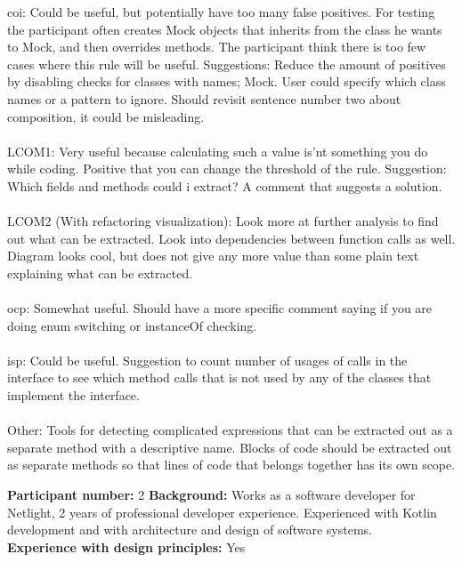 \noindent \gls{coi}: Could be useful, but potentially have too many false positives. For testing the participant often creates Mock objects that inherits from the class he wants to Mock, and then overrides methods. The participant think there is too few cases where this rule will be useful. Suggestions: Reduce the amount of positives by disabling checks for classes with names; Mock. User could specify which class names or a pattern to ignore. Should revisit sentence number two about composition, it could be misleading.\\\\

\noindent LCOM1: Very useful because calculating such a value is'nt something you do while coding. Positive that you can change the threshold of the rule. Suggestion: Which fields and methods could i extract? A comment that suggests a solution. \\\\

\noindent LCOM2 (With refactoring visualization): Look more at further analysis to find out what can be extracted. Look into dependencies between function calls as well. Diagram looks cool, but does not give any more value than some plain text explaining what can be extracted. \\\\

\noindent \gls{ocp}: Somewhat useful. Should have a more specific comment saying if you are doing enum switching or instanceOf checking. \\\\

\noindent \gls{isp}: Could be useful. Suggestion to count number of usages of calls in the interface to see which method calls that is not used by any of the classes that implement the interface. \\\\

\noindent Other: Tools for detecting complicated expressions that can be extracted out as a separate method with a descriptive name. Blocks of code should be extracted out as separate methods so that lines of code that belongs together has its own scope. 
\clearpage


\noindent\textbf{Participant number:} 2 \newline
\textbf{Background:} Works as a software developer for Netlight, 2 years of professional developer experience. Experienced with Kotlin development and with architecture and design of software systems.\\
\textbf{Experience with design principles:} Yes \\\\

